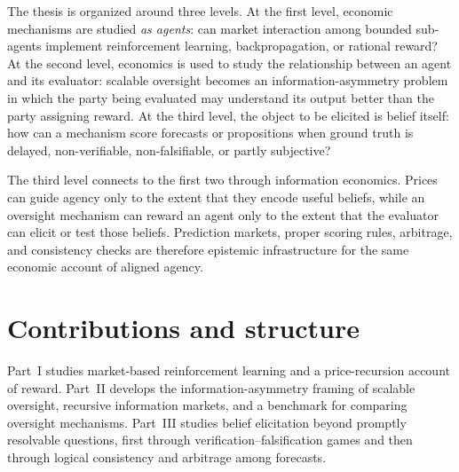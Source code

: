 \begin{drafttext}
The thesis is organized around three levels. At the first level, economic
mechanisms are studied \emph{as agents}: can market interaction among bounded
sub-agents implement reinforcement learning, backpropagation, or rational reward?
At the second level, economics is used to study the relationship between an
agent and its evaluator: scalable oversight becomes an information-asymmetry
problem in which the party being evaluated may understand its output better
than the party assigning reward. At the third level, the object to be elicited
is belief itself: how can a mechanism score forecasts or propositions when
ground truth is delayed, non-verifiable, non-falsifiable, or partly subjective?

The third level connects to the first two through information economics. Prices
can guide agency only to the extent that they encode useful beliefs, while an
oversight mechanism can reward an agent only to the extent that the evaluator
can elicit or test those beliefs. Prediction markets, proper scoring rules,
arbitrage, and consistency checks are therefore epistemic infrastructure for the
same economic account of aligned agency.
\end{drafttext}

\section{Contributions and structure}

\begin{drafttext}
Part~I studies market-based reinforcement learning and a price-recursion account
of reward. Part~II develops the information-asymmetry framing of scalable
oversight, recursive information markets, and a benchmark for comparing
oversight mechanisms. Part~III studies belief elicitation beyond promptly
resolvable questions, first through verification--falsification games and then
through logical consistency and arbitrage among forecasts.
\end{drafttext}
